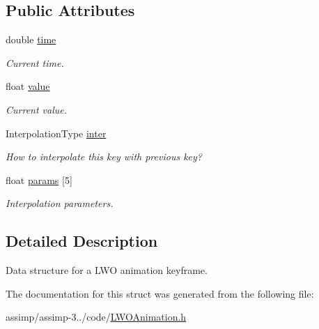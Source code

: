\subsection*{Public Attributes}
\begin{DoxyCompactItemize}
\item 
\hypertarget{struct_assimp_1_1_l_w_o_1_1_key_a77139b43cbc4014253f3d4597f09fbc4}{double \hyperlink{struct_assimp_1_1_l_w_o_1_1_key_a77139b43cbc4014253f3d4597f09fbc4}{time}}\label{struct_assimp_1_1_l_w_o_1_1_key_a77139b43cbc4014253f3d4597f09fbc4}

\begin{DoxyCompactList}\small\item\em Current time. \end{DoxyCompactList}\item 
\hypertarget{struct_assimp_1_1_l_w_o_1_1_key_a3537e26ec17f03dd83e195b9d873b1bd}{float \hyperlink{struct_assimp_1_1_l_w_o_1_1_key_a3537e26ec17f03dd83e195b9d873b1bd}{value}}\label{struct_assimp_1_1_l_w_o_1_1_key_a3537e26ec17f03dd83e195b9d873b1bd}

\begin{DoxyCompactList}\small\item\em Current value. \end{DoxyCompactList}\item 
\hypertarget{struct_assimp_1_1_l_w_o_1_1_key_a38a43a14ec520ad11a78a8319801328d}{Interpolation\+Type \hyperlink{struct_assimp_1_1_l_w_o_1_1_key_a38a43a14ec520ad11a78a8319801328d}{inter}}\label{struct_assimp_1_1_l_w_o_1_1_key_a38a43a14ec520ad11a78a8319801328d}

\begin{DoxyCompactList}\small\item\em How to interpolate this key with previous key? \end{DoxyCompactList}\item 
\hypertarget{struct_assimp_1_1_l_w_o_1_1_key_ad960628a34f0e89b1eadcb5d0d404227}{float \hyperlink{struct_assimp_1_1_l_w_o_1_1_key_ad960628a34f0e89b1eadcb5d0d404227}{params} \mbox{[}5\mbox{]}}\label{struct_assimp_1_1_l_w_o_1_1_key_ad960628a34f0e89b1eadcb5d0d404227}

\begin{DoxyCompactList}\small\item\em Interpolation parameters. \end{DoxyCompactList}\end{DoxyCompactItemize}


\subsection{Detailed Description}
Data structure for a L\+W\+O animation keyframe. 

The documentation for this struct was generated from the following file\+:\begin{DoxyCompactItemize}
\item 
assimp/assimp-\/3../code/\hyperlink{_l_w_o_animation_8h}{L\+W\+O\+Animation.\+h}\end{DoxyCompactItemize}

